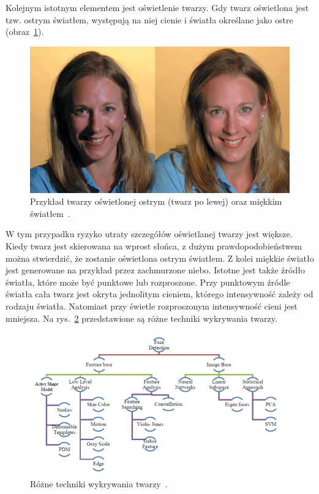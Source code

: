 \documentclass[a4paper,twoside,12pt]{book}
\begin{document}
    Kolejnym istotnym elementem jest oświetlenie twarzy.
    Gdy twarz oświetlona jest tzw. ostrym światłem, występują na
    niej cienie i światła określane jako ostre (obraz~\ref{fig.oswietlenieTwarzy}).
    \begin{figure}[h!]
        \centering
        \includegraphics[width=12cm]{Obrazy/oswietlenieTwarzy.jpg}
        \caption{Przykład twarzy oświetlonej ostrym (twarz po lewej) oraz miękkim światłem~\cite{oswietlenieTwarzy}.}
        \label{fig.oswietlenieTwarzy}
    \end{figure}
    W tym przypadku ryzyko utraty szczegółów oświetlanej twarzy jest większe.
    Kiedy twarz jest skierowana na wprost słońca, z dużym
    prawdopodobieństwem można stwierdzić, że zostanie oświetlona ostrym światłem.
    Z kolei miękkie światło jest generowane na przykład przez zachmurzone niebo.
    Istotne jest także źródło światła, które
    może być punktowe lub rozproszone.
    Przy punktowym źródle światła cała twarz jest
    okryta jednolitym cieniem, którego intensywność zależy od rodzaju światła.
    Natomiast przy świetle rozproszonym intensywność cieni jest mniejsza.
    Na rys.~\ref{fig.technikiWykrywaniaTwarzy} przedstawione są różne techniki wykrywania twarzy.
    \begin{figure}
        \centering
        \includegraphics[width=15cm]{Obrazy/technikiWykrywaniaTwarzy.jpg}
        \caption{Różne techniki wykrywania twarzy~\cite{faceDetectionTechniques}.}
        \label{fig.technikiWykrywaniaTwarzy}
    \end{figure}
\end{document}
